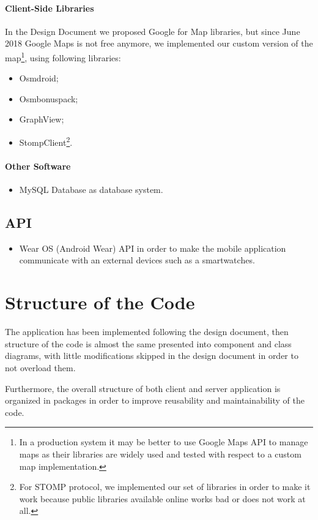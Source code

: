 \documentclass[a4paper]{article}
\begin{document}
\paragraph{Client-Side Libraries}
In the Design Document we proposed Google for Map libraries, but since June 2018 Google Maps is not free anymore, we implemented our custom version  of the map\footnote{In a production system it may be better to use Google Maps API to manage maps as their libraries are widely used and tested with respect to a custom map implementation.}, using following libraries:
\begin{itemize}
    \item Osmdroid;
    \item Osmbonuspack;
    \item GraphView;
    \item StompClient\footnote{For STOMP protocol, we implemented our set of libraries in order to make it work because public libraries available online works bad or does not work at all.}.
\end{itemize}

\paragraph{Other Software}
\begin{itemize}
    \item MySQL Database as database system.
\end{itemize}

\subsection{API}
\begin{itemize}
    \item Wear OS (Android Wear) API in order to make the mobile application communicate with an external devices such as a smartwatches.
\end{itemize}

\newpage
\section{Structure of the Code}
The application has been implemented following the design document, then structure of the code is almost the same presented into component and class diagrams, with little modifications skipped in the design document in order to not overload them.

Furthermore, the overall structure of both client and server application is organized in packages in order to improve reusability and maintainability of the code.
\end{document}
